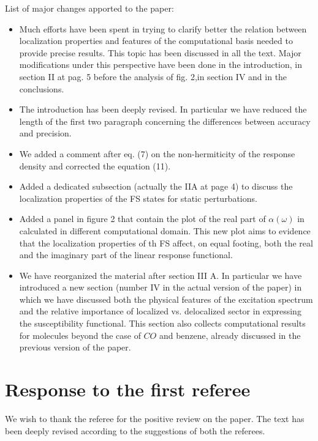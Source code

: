 \documentclass[11pt,a4paper]{article}
\begin{document}

List of major changes apported to the paper:
\begin{itemize}
 \item Much efforts have been spent in trying to clarify better the relation between localization properties and features of the computational basis needed 
 to provide precise results. This topic has been discussed in all the text. Major modifications under this perspective have been done in the introduction, in section II at pag. 5 before the analysis of fig. 2,in section IV and in the conclusions. 
 \item The introduction has been deeply revised. In particular we have reduced the length of the first two paragraph concerning the differences between accuracy and precision.
 \item We added a comment after eq. (7) on the non-hermiticity of the response density and corrected the equation (11).
 \item Added a dedicated subsection (actually the IIA at page 4)  to discuss the localization properties of the FS states for static perturbations. 
 \item Added a panel in figure 2 that contain the plot of the real part of $\alpha(\omega)$ in calculated in different computational domain. This new plot aims to evidence that the localization
 properties of th FS affect, on equal footing, both the real and the imaginary part of the linear response functional.
 \item We have reorganized the material after section III A. In particular we have introduced a new section (number IV in the actual version of the paper) in which we have discussed both the physical features of the excitation spectrum and the relative importance of localized vs. delocalized sector in expressing the susceptibility functional. This section also collects computational results for molecules beyond the case of $CO$ and benzene, already discussed in the previous version of the paper.  
\end{itemize}

\section*{Response to the first referee}

We wish to thank the referee for the positive review on the paper. The text has been deeply revised according to the suggestions of both the referees.
\end{document}
